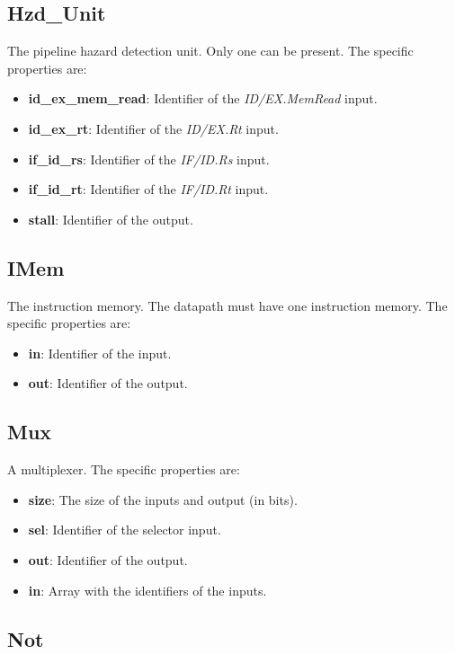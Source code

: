 \documentclass[11pt,a4paper,twoside,titlepage]{report}
\begin{document}
\subsection{Hzd\_Unit}

The pipeline hazard detection unit. Only one can be present.
The specific properties are:
\begin{itemize}
	\item \textbf{id\_ex\_mem\_read}: Identifier of the \emph{ID/EX.MemRead} input.
	\item \textbf{id\_ex\_rt}: Identifier of the \emph{ID/EX.Rt} input.
	\item \textbf{if\_id\_rs}: Identifier of the \emph{IF/ID.Rs} input.
	\item \textbf{if\_id\_rt}: Identifier of the \emph{IF/ID.Rt} input.
	\item \textbf{stall}: Identifier of the output.
\end{itemize}

\subsection{IMem}

The instruction memory. The datapath must have one instruction memory.
The specific properties are:
\begin{itemize}
	\item \textbf{in}: Identifier of the input.
	\item \textbf{out}: Identifier of the output.
\end{itemize}

\subsection{Mux}

A multiplexer. The specific properties are:
\begin{itemize}
	\item \textbf{size}: The size of the inputs and output (in bits).
	\item \textbf{sel}: Identifier of the selector input.
	\item \textbf{out}: Identifier of the output.
	\item \textbf{in}: Array with the identifiers of the inputs.
\end{itemize}

\subsection{Not}
\end{document}
